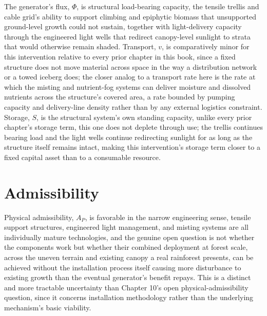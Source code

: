 \documentclass[11pt,oneside]{book}
\begin{document}
The generator's flux, $\Phi$, is structural load-bearing capacity, the tensile trellis and cable grid's ability to support climbing and epiphytic biomass that unsupported ground-level growth could not sustain, together with light-delivery capacity through the engineered light wells that redirect canopy-level sunlight to strata that would otherwise remain shaded. Transport, $v$, is comparatively minor for this intervention relative to every prior chapter in this book, since a fixed structure does not move material across space in the way a distribution network or a towed iceberg does; the closer analog to a transport rate here is the rate at which the misting and nutrient-fog systems can deliver moisture and dissolved nutrients across the structure's covered area, a rate bounded by pumping capacity and delivery-line density rather than by any external logistics constraint. Storage, $S$, is the structural system's own standing capacity, unlike every prior chapter's storage term, this one does not deplete through use; the trellis continues bearing load and the light wells continue redirecting sunlight for as long as the structure itself remains intact, making this intervention's storage term closer to a fixed capital asset than to a consumable resource.

\section*{Admissibility}

Physical admissibility, $A_P$, is favorable in the narrow engineering sense, tensile support structures, engineered light management, and misting systems are all individually mature technologies, and the genuine open question is not whether the components work but whether their combined deployment at forest scale, across the uneven terrain and existing canopy a real rainforest presents, can be achieved without the installation process itself causing more disturbance to existing growth than the eventual generator's benefit repays. This is a distinct and more tractable uncertainty than Chapter 10's open physical-admissibility question, since it concerns installation methodology rather than the underlying mechanism's basic viability.
\end{document}
